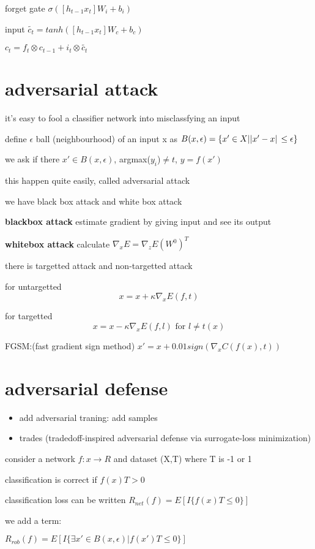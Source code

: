 \documentclass[10pt]{article}
\theoremstyle{break}
\begin{document}
forget gate  $\sigma([h_{t-1} x_t]W_i + b_i)$

input $\tilde{c_t} = tanh([h_{t-1}x_t]W_c+b_c)$

$c_t = f_t \otimes c_{t-1} + i_t \otimes \tilde{c_t}$

\section{adversarial attack}
it's easy to fool a classifier network into misclassfying an input

define $\epsilon$ ball (neighbourhood) of an input x as 
$B(x,\epsilon)=\{x'\in X| \abs*{x'-x}\leq \epsilon\}$

we ask if there $x'\in B(x,\epsilon)$, argmax($y_i$)$\neq t$, $y=f(x')$

this happen quite easily, called adversarial attack 

we have black box attack and white box attack

\textbf{blackbox attack} estimate gradient by giving input and see its output 

\textbf{whitebox attack} calculate $\nabla_xE=\nabla_zE (W^0)^T$

there is targetted attack and non-targetted attack 

for untargetted
$$x=x+\kappa \nabla_xE(f,t)$$

for targetted 
$$x=x-\kappa\nabla_xE(f,l)\text{    for }l\neq t(x)$$

FGSM:(fast gradient sign method)
$x'= x+0.01 sign(\nabla_xC(f(x),t))$


\section{adversarial defense}
\begin{itemize}
    \item add adversarial traning: add samples
    \item trades (tradedoff-inspired adversarial defense via surrogate-loss minimization)
\end{itemize}

consider a network $f:x\rightarrow R$
and dataset (X,T) where T is -1 or 1 

classification is correct if $f(x)T>0$

classification loss can be written $R_{net}(f)=E[I\{f(x)T\leq 0\}]$

we add a term:

$R_{rob}(f)=E[I\{\exists x'\in B(x,\epsilon)| f(x')T\leq 0\}]$
\end{document}
